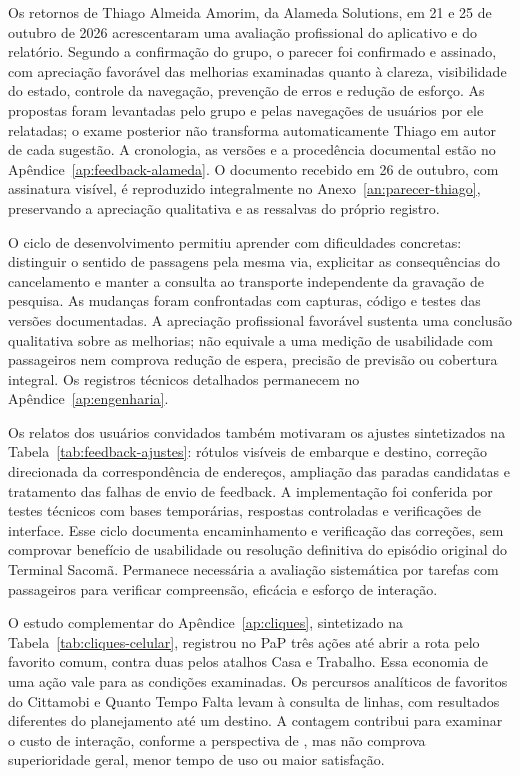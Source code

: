 \documentclass[12pt,oneside,a4paper,brazil,chapter=TITLE]{abntex2}
\begin{document}
Os retornos de Thiago Almeida Amorim, da Alameda Solutions, em 21 e 25 de outubro de 2026 acrescentaram uma avaliação profissional do aplicativo e do relatório. Segundo a confirmação do grupo, o parecer foi confirmado e assinado, com apreciação favorável das melhorias examinadas quanto à clareza, visibilidade do estado, controle da navegação, prevenção de erros e redução de esforço. As propostas foram levantadas pelo grupo e pelas navegações de usuários por ele relatadas; o exame posterior não transforma automaticamente Thiago em autor de cada sugestão. A cronologia, as versões e a procedência documental estão no Apêndice~\ref{ap:feedback-alameda}. O documento recebido em 26 de outubro, com assinatura visível, é reproduzido integralmente no Anexo~\ref{an:parecer-thiago}, preservando a apreciação qualitativa e as ressalvas do próprio registro.

O ciclo de desenvolvimento permitiu aprender com dificuldades concretas: distinguir o sentido de passagens pela mesma via, explicitar as consequências do cancelamento e manter a consulta ao transporte independente da gravação de pesquisa. As mudanças foram confrontadas com capturas, código e testes das versões documentadas. A apreciação profissional favorável sustenta uma conclusão qualitativa sobre as melhorias; não equivale a uma medição de usabilidade com passageiros nem comprova redução de espera, precisão de previsão ou cobertura integral. Os registros técnicos detalhados permanecem no Apêndice~\ref{ap:engenharia}.

Os relatos dos usuários convidados também motivaram os ajustes sintetizados na Tabela~\ref{tab:feedback-ajustes}: rótulos visíveis de embarque e destino, correção direcionada da correspondência de endereços, ampliação das paradas candidatas e tratamento das falhas de envio de feedback. A implementação foi conferida por testes técnicos com bases temporárias, respostas controladas e verificações de interface. Esse ciclo documenta encaminhamento e verificação das correções, sem comprovar benefício de usabilidade ou resolução definitiva do episódio original do Terminal Sacomã. Permanece necessária a avaliação sistemática por tarefas com passageiros para verificar compreensão, eficácia e esforço de interação.

O estudo complementar do Apêndice~\ref{ap:cliques}, sintetizado na Tabela~\ref{tab:cliques-celular}, registrou no PaP três ações até abrir a rota pelo favorito comum, contra duas pelos atalhos Casa e Trabalho. Essa economia de uma ação vale para as condições examinadas. Os percursos analíticos de favoritos do Cittamobi e Quanto Tempo Falta levam à consulta de linhas, com resultados diferentes do planejamento até um destino. A contagem contribui para examinar o custo de interação, conforme a perspectiva de \citet{card1980}, mas não comprova superioridade geral, menor tempo de uso ou maior satisfação.
\end{document}
